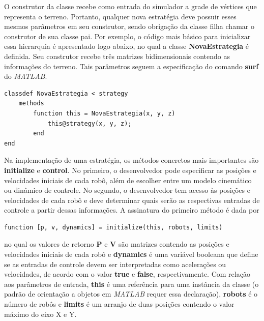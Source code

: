 \documentclass[11pt,a4paper]{article}
\begin{document}
O construtor da classe recebe como entrada do simulador a grade de
vértices que representa o terreno. Portanto, qualquer nova estratégia
deve possuir esses mesmos parâmetros em seu construtor, sendo
obrigação da classe filha chamar o construtor de sua classe pai. Por
exemplo, o código mais básico para inicializar essa hierarquia é
apresentado logo abaixo, no qual a classe \textbf{NovaEstrategia} é
definida. Seu construtor recebe três matrizes bidimensionais contendo
as informações do terreno. Tais parâmetros seguem a especificação do
comando \textbf{surf} do \textit{MATLAB}.
\begin{lstlisting}
classdef NovaEstrategia < strategy
    methods
        function this = NovaEstrategia(x, y, z)
            this@strategy(x, y, z);
        end
end
\end{lstlisting}

Na implementação de uma estratégia, os métodos concretos mais
importantes são \textbf{initialize} e \textbf{control}. No primeiro, o
desenvolvedor pode especificar as posições e velocidades iniciais de
cada robô, além de escolher entre um modelo cinemático ou dinâmico de
controle. No segundo, o desenvolvedor tem acesso às posições e
velocidades de cada robô e deve determinar quais serão as respectivas
entradas de controle a partir dessas informações. A assinatura do
primeiro método é dada por 
\begin{lstlisting}
function [p, v, dynamics] = initialize(this, robots, limits)
\end{lstlisting}
no qual os valores de retorno $\mathbf{P}$ e $\mathbf{V}$ são matrizes
contendo as posições e velocidades iniciais de cada robô e
\textbf{dynamics} é uma variável booleana que define se as entradas de
controle devem ser interpretadas como acelerações ou velocidades, de
acordo com o valor \textbf{true} e \textbf{false},
respectivamente. Com relação aos parâmetros de entrada, \textbf{this}
é uma referência para uma instância da classe (o padrão de orientação
a objetos em \textit{MATLAB} requer essa declaração), \textbf{robots}
é o número de robôs e \textbf{limits} é um arranjo de duas posições
contendo o valor máximo do eixo X e Y.
\end{document}
